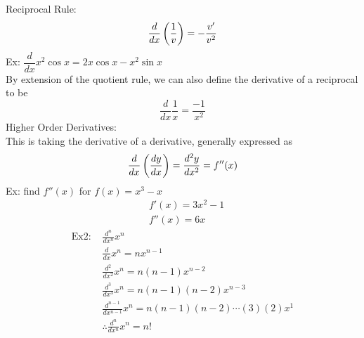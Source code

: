 \documentclass[11pt, fleqn]{article}
\begin{document}
Reciprocal Rule:
\begin{align*}
    \frac{d}{dx}\left( \frac{1}{v} \right)=-\frac{v'}{v^2}
\end{align*}
Ex: $\dfrac{d}{dx}x^2\cos x=2x\cos x-x^2\sin x$\\
By extension of the quotient rule, we can also define the derivative of a reciprocal to be
$$\frac{d}{dx}\frac{1}{x}=\frac{-1}{x^2}$$
Higher Order Derivatives:\\
This is taking the derivative of a derivative, generally expressed as $$\frac{d}{dx}\left( \frac{dy}{dx} \right)=\frac{d^2y}{dx^2}=f''(x)$$
Ex: find $f''(x)$ for $f(x)=x^3-x$
\begin{align*}
    &f'(x)=3x^2-1\\
    &f''(x)=6x
\end{align*}
\begin{align*}
    \text{Ex2: }&\frac{d^n}{dx^n}x^n\\
    &\frac{d}{dx}x^n=nx^{n-1}\\
    &\frac{d^2}{dx^2}x^n=n(n-1)x^{n-2}\\
    &\frac{d^3}{dx^3}x^n=n(n-1)(n-2)x^{n-3}\\
    &\frac{d^{n-1}}{dx^{n-1}}x^n=n(n-1)(n-2)\cdots(3)(2)x^1\\
    &\therefore\frac{d^n}{dx^n}x^n=n!
\end{align*}
\end{document}
